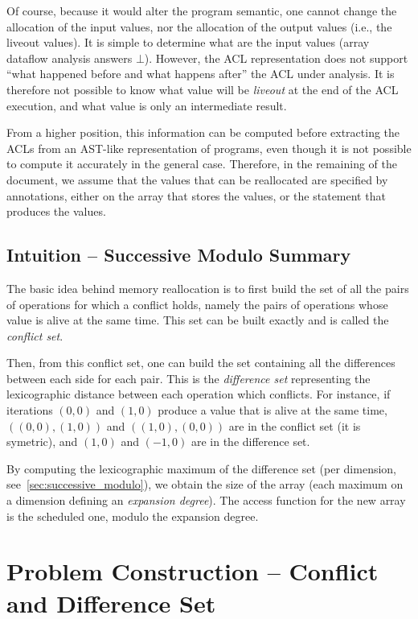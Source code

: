 \documentclass{article}
\begin{document}
Of course, because it would alter the program semantic, one cannot change the
allocation of the input values, nor the allocation of the output values (i.e.,
the liveout values). It is simple to determine what are the input values (array
dataflow analysis answers $\bot$). However, the ACL representation does not
support ``what happened before and what happens after'' the ACL under analysis.
It is therefore not possible to know what value will be \emph{liveout} at the
end of the ACL execution, and what value is only an intermediate result.

From a higher position, this information can be computed before extracting the
ACLs from an AST-like representation of programs, even though it is not
possible to compute it accurately in the general case. Therefore, in the
remaining of the document, we assume that the values that can be
reallocated are specified by annotations, either on the array that stores the
values, or the statement that produces the values.

\subsection*{Intuition -- Successive Modulo Summary}

The basic idea behind memory reallocation is to first build the set of all the
pairs of operations for which a conflict holds, namely the pairs of operations
whose value is alive at the same time. This set can be built exactly and is
called the \emph{conflict set}. 

Then, from this conflict set, one can build the set containing all the
differences between each side for each pair. This is the \emph{difference set}
representing the lexicographic distance between each operation which conflicts.
For instance, if iterations $(0,0)$ and $(1,0)$ produce a value that is alive at
the same time, $((0,0),(1,0))$ and $((1,0),(0,0))$ are in the conflict set (it
is symetric), and $(1,0)$ and $(-1,0)$ are in the difference set.

By computing the lexicographic maximum of the difference set (per dimension,
see~\ref{sec:successive_modulo}), we obtain the size of the array (each maximum
on a dimension defining an \emph{expansion degree}). The access function for
the new array is the scheduled one, modulo the expansion degree.

{\center\noindent\makebox[\linewidth]{\rule{0.7\paperwidth}{0.4pt}}}
\section{Problem Construction -- Conflict and Difference Set}
\end{document}
